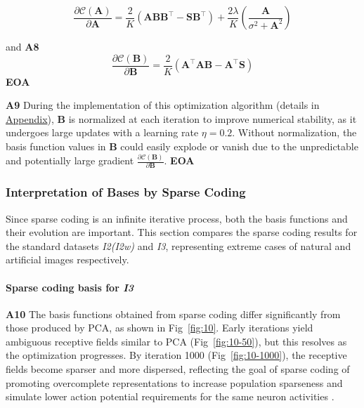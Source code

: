 \documentclass[11pt, twocolumn]{article}
\begin{document}
\vspace{-2em}

\begin{equation}
    \label{eq:dcda}
    \frac{\partial \mathcal{C}(\mathbf{A})}{\partial \mathbf{A}} = \frac{2}{K} \left( \mathbf{A} \mathbf{B} \mathbf{B}^\top - \mathbf{S} \mathbf{B}^\top \right) + \frac{2 \lambda}{K} \left( \frac{\mathbf{A}}{\sigma^2 + \mathbf{A}^2} \right)
\end{equation}

and \textbf{A8}
\begin{equation}
    \label{eq:dcdb}
    \frac{\partial \mathcal{C}(\mathbf{B})}{\partial \mathbf{B}} = \frac{2}{K} \left(\mathbf{A}^\top \mathbf{A} \mathbf{B} - \mathbf{A}^\top \mathbf{S}\right)
\end{equation}
\textbf{EOA}

\textbf{A9} During the implementation of this optimization algorithm (details in \hyperref[sec:appendix]{Appendix}), $\mathbf{B}$ is normalized at each iteration to improve numerical stability, as it undergoes large updates with a learning rate $\eta = 0.2$. Without normalization, the basis function values in $\mathbf{B}$ could easily explode or vanish due to the unpredictable and potentially large gradient $\frac{\partial \mathcal{C}(\mathbf{B})}{\partial \mathbf{B}}$. \textbf{EOA}

\subsubsection{Interpretation of Bases by Sparse Coding}

\vspace{-0.5em}

Since sparse coding is an infinite iterative process, both the basis functions and their evolution are important. This section compares the sparse coding results for the standard datasets \textit{I2(I2w)} and \textit{I3}, representing extreme cases of natural and artificial images respectively.

\paragraph{Sparse coding basis for \textit{I3}}

\textbf{A10} The basis functions obtained from sparse coding differ significantly from those produced by PCA, as shown in Fig~\ref{fig:10}. Early iterations yield ambiguous receptive fields similar to PCA (Fig~\ref{fig:10-50}), but this resolves as the optimization progresses. By iteration 1000 (Fig~\ref{fig:10-1000}), the receptive fields become sparser and more dispersed, reflecting the goal of sparse coding of promoting overcomplete representations to increase population sparseness and simulate lower action potential requirements for the same neuron activities \cite{olshausen_2004_sparse}.
\end{document}
